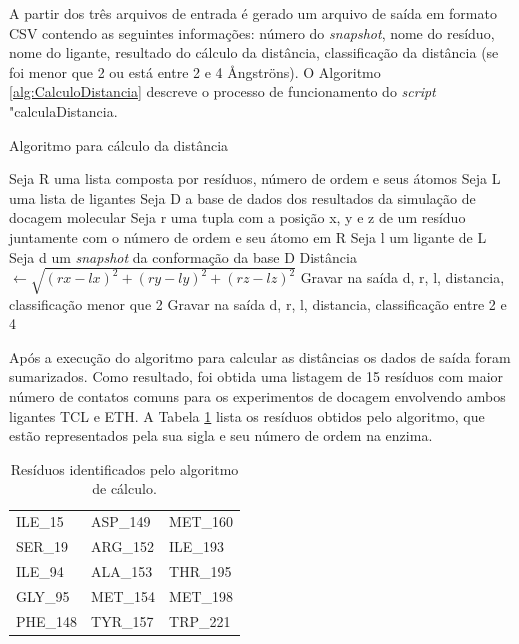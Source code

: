 % 
%
%       

A partir dos três arquivos de entrada é gerado um arquivo de saída em formato CSV contendo as seguintes informações: número do \emph{snapshot}, nome do resíduo, nome do ligante, resultado do cálculo da distância, classificação da distância (se foi menor que 2 ou está entre 2 e 4 {\AA}ngstr\"ons).
O Algoritmo \ref{alg:CalculoDistancia} descreve o processo de funcionamento do \emph{script} "calculaDistancia.

\begin{algorithm}[H]
\caption{Algoritmo para cálculo da distância}
\label{alg:CalculoDistancia}
{\fontsize{10}{10}\selectfont
\begin{algorithmic}[1]
	\STATE Seja R uma lista composta por resíduos, número de ordem e seus átomos
	\STATE Seja L uma lista de ligantes
	\STATE Seja D a base de dados dos resultados da simulação de docagem molecular
	\STATE Seja r uma tupla com a posição x, y e z de um resíduo juntamente com o número de ordem e seu átomo em R
	\STATE Seja l um ligante de L
	\STATE Seja d um \emph{snapshot} da conformação da base D
			\STATE Distância $\gets \sqrt{(rx - lx)^{2} +(ry - ly)^{2} + (rz - lz)^{2}}$ 
			\ENDIF
				\STATE Gravar na saída d, r, l, distancia, classificação menor que 2
				\ELSE
				\STATE Gravar na saída d, r, l, distancia, classificação entre 2 e 4
				\ENDIF
			\ENDIF
			\ENDFOR
		\ENDFOR
	\ENDFOR
\end{algorithmic}
}
\end{algorithm}

% 
%
%       

Após a execução do algoritmo para calcular as distâncias os dados de saída foram sumarizados. Como resultado, foi obtida uma listagem de 15 resíduos com maior número de contatos comuns para os experimentos de docagem envolvendo ambos ligantes TCL e ETH. A Tabela \ref{tab:listaProvavelRelevantes} lista os resíduos obtidos pelo algoritmo, que estão representados pela sua sigla e seu número de ordem na enzima.

\begin{table}[h]
	\caption{Resíduos identificados pelo algoritmo de cálculo.}
	\label{tab:listaProvavelRelevantes}
	\centering
	\begin{tabular}{@{}lll@{}}
	ILE\_15  & ASP\_149 & MET\_160 \\
	SER\_19  & ARG\_152 & ILE\_193 \\
	ILE\_94  & ALA\_153 & THR\_195 \\
	GLY\_95  & MET\_154 & MET\_198 \\
	PHE\_148 & TYR\_157 & TRP\_221 \\
	\end{tabular}
\end{table}

